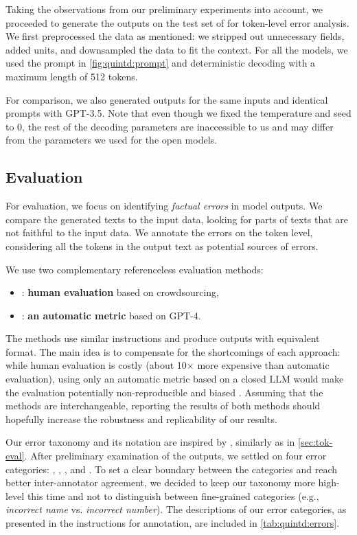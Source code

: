 Taking the observations from our preliminary experiments into account, we proceeded to generate the outputs on the test set of \benchmark{} for token-level error analysis. We first preprocessed the data as mentioned: we stripped out unnecessary fields, added units, and downsampled the data to fit the context. For all the models, we used the prompt in \autoref{fig:quintd:prompt} and deterministic decoding with a maximum length of 512 tokens.

For comparison, we also generated outputs for the same inputs and identical prompts with GPT-3.5. Note that even though we fixed the temperature and seed to $0$, the rest of the decoding parameters are inaccessible to us and may differ from the parameters we used for the open models.


\subsection{Evaluation}
\label{sec:quintd:eval}
For evaluation, we focus on identifying \emph{factual errors} in model outputs. We compare the generated texts to the input data, looking for parts of texts that are not faithful to the input data. We annotate the errors on the token level, considering all the tokens in the output text as potential sources of errors.


We use two complementary referenceless evaluation methods:
\begin{itemize}
    \item \humanmetric{}: \textbf{human evaluation} based on crowdsourcing,
    \item \gptmetric{}: \textbf{an automatic metric} based on GPT-4.
\end{itemize}

The methods use similar instructions and produce outputs with equivalent format. The main idea is to compensate for the shortcomings of each approach: while human evaluation is costly (about 10$\times$ more expensive than automatic evaluation), using only an automatic metric based on a closed LLM would make the evaluation potentially non-reproducible and biased \cite{kocmiGEMBAMQMDetectingTranslation2023,wangLargeLanguageModels2023}. Assuming that the methods are interchangeable, reporting the results of both methods should hopefully increase the robustness and replicability of our results.




Our error taxonomy and its notation are inspired by \citet{thomsonGoldStandardMethodology2020}, similarly as in \autoref{sec:tok-eval}. After preliminary examination of the outputs, we settled on four error categories: , , , and . To set a clear boundary between the categories and reach better inter-annotator agreement, we decided to keep our taxonomy more high-level this time and not to distinguish between fine-grained categories (e.g., \textit{incorrect name} vs. \textit{incorrect number}). The descriptions of our error categories, as presented in the instructions for annotation, are included in \autoref{tab:quintd:errors}.


